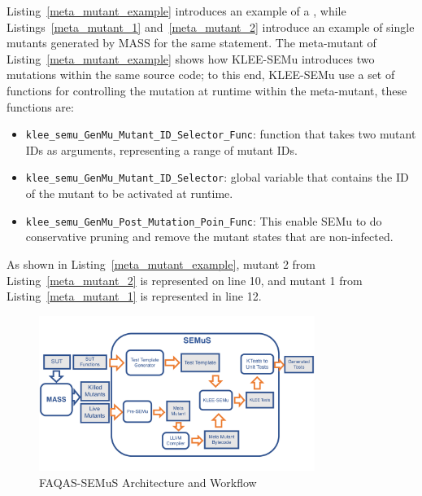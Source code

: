 

Listing~\ref{meta_mutant_example} introduces an example of a , while Listings~\ref{meta_mutant_1} and~\ref{meta_mutant_2} introduce an example of single mutants generated by MASS for the same statement.
The meta-mutant of Listing~\ref{meta_mutant_example} shows how KLEE-SEMu introduces two mutations within the same source code; to this end, KLEE-SEMu use a set of functions for controlling the mutation at runtime within the meta-mutant, these functions are:

\begin{itemize}
	\item \texttt{klee\_semu\_GenMu\_Mutant\_ID\_Selector\_Func}: function that takes two mutant IDs as arguments, representing a range of mutant IDs.
    \item \texttt{klee\_semu\_GenMu\_Mutant\_ID\_Selector}: global variable that contains the ID of the mutant to be activated at runtime.
	\item \texttt{klee\_semu\_GenMu\_Post\_Mutation\_Poin\_Func}: This enable SEMu to do conservative pruning and remove the mutant states that are non-infected.
\end{itemize}

As shown in Listing~\ref{meta_mutant_example}, mutant 2 from Listing~\ref{meta_mutant_2} is represented on line 10, and mutant 1 from Listing~\ref{meta_mutant_1} is represented in line 12.


\begin{figure}[tb]
\begin{center}
\includegraphics[width=0.8\textwidth]{images/semus-architecture}
\caption{FAQAS-SEMuS Architecture and Workflow}
\label{fig:semus_architecture}
\end{center}
\end{figure}

